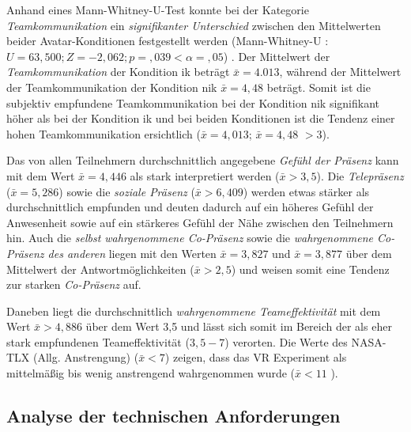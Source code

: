 \documentclass[a4paper,11pt]{article}%
\renewcommand{\\}{\vspace*{0.5\baselineskip} \newline}
\begin{document}
{{Anhand eines Mann-Whitney-U-Test konnte bei der Kategorie \textit{Teamkommunikation} ein \textit{signifikanter Unterschied} zwischen den Mittelwerten beider Avatar-Konditionen festgestellt werden (Mann-Whitney-U : $U = 63,500; Z = -2,062; p =,039 < \alpha = ,05$) . Der Mittelwert der \textit{Teamkommunikation} der Kondition \ac{ik} beträgt $\bar{x} = 4.013$, während der Mittelwert der Teamkommunikation der Kondition \ac{nik} $\bar{x} = 4,48$ beträgt. Somit ist die subjektiv empfundene Teamkommunikation bei der Kondition \ac{nik} signifikant höher als bei der Kondition \ac{ik} und bei beiden Konditionen ist die Tendenz einer hohen Teamkommunikation ersichtlich ($\bar{x} = 4,013$; $\bar{x} = 4,48$ $ > 3$).

Das von allen Teilnehmern durchschnittlich angegebene \textit{Gefühl der Präsenz} kann mit dem Wert $\bar{x} = 4,446$ als stark interpretiert werden ($\bar{x} > 3,5$). Die \textit{Telepräsenz} ($\bar{x} = 5,286$) sowie die \textit{soziale Präsenz} ($\bar{x} > 6,409$) werden etwas stärker als durchschnittlich empfunden und deuten dadurch auf ein höheres Gefühl der Anwesenheit sowie auf ein stärkeres Gefühl der Nähe zwischen den Teilnehmern hin. Auch die \textit{selbst wahrgenommene Co-Präsenz} sowie die \textit{wahrgenommene Co-Präsenz des anderen} liegen mit den Werten $\bar{x} = 3,827$ und $\bar{x} = 3,877$ über dem Mittelwert der Antwortmöglichkeiten ($\bar{x} > 2,5$) und weisen somit eine Tendenz zur starken \textit{Co-Präsenz} auf.

Daneben liegt die durchschnittlich \textit{wahrgenommene Teameffektivität} mit dem Wert $\bar{x} > 4,886$ über dem Wert 3,5 und lässt sich somit im Bereich der als eher stark empfundenen Teameffektivität ($3,5 - 7$) verorten.
Die Werte des NASA-TLX (Allg. Anstrengung) ($\bar{x} < 7$) zeigen, dass das VR Experiment als mittelmäßig bis wenig anstrengend wahrgenommen wurde ($\bar{x} < 11$ ).


\subsection{Analyse der technischen Anforderungen}

}}
\end{document}
